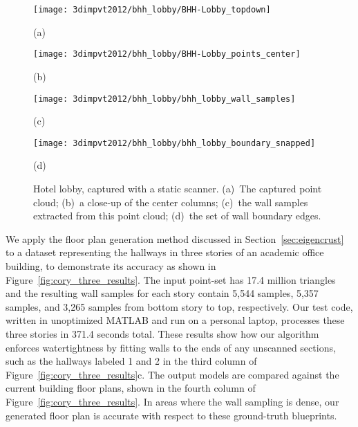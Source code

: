 \documentclass[12pt,onecolumn,oneside]{book}
\begin{document}
\begin{figure}[p]

\centering
\begin{minipage}[b]{0.49\linewidth}
  \centering
  \centerline{\texttt{[image: 3dimpvt2012/bhh\_lobby/BHH-Lobby\_topdown]}}
  \centerline{(a)}
\end{minipage}
\begin{minipage}[b]{0.49\linewidth}
  \centering
  \centerline{\texttt{[image: 3dimpvt2012/bhh\_lobby/BHH-Lobby\_points\_center]}}
  \centerline{(b)}
\end{minipage}

\begin{minipage}[b]{0.49\linewidth}
  \centering
  \centerline{\texttt{[image: 3dimpvt2012/bhh\_lobby/bhh\_lobby\_wall\_samples]}}
  \centerline{(c)}
\end{minipage}
\begin{minipage}[b]{0.49\linewidth}
  \centering
  \centerline{\texttt{[image: 3dimpvt2012/bhh\_lobby/bhh\_lobby\_boundary\_snapped]}}
  \centerline{(d)}
\end{minipage}

\caption[Hotel lobby, captured with a static scanner.]{Hotel lobby, captured with a static scanner. (a)~The captured point cloud; (b)~a close-up of the center columns; (c)~the wall samples extracted from this point cloud; (d)~the set of wall boundary edges.}
\label{fig:bhh_lobby_results}

\end{figure}

We apply the floor plan generation method discussed in Section~\ref{sec:eigencrust} to a dataset representing the hallways in three stories of an academic office building, to demonstrate its accuracy as shown in Figure~\ref{fig:cory_three_results}.  The input point-set has 17.4 million triangles and the resulting wall samples for each story contain 5,544 samples, 5,357 samples, and 3,265 samples from bottom story to top, respectively.  Our test code, written in unoptimized MATLAB and run on a personal laptop, processes these three stories in 371.4 seconds total.  These results show how our algorithm enforces watertightness by fitting walls to the ends of any unscanned sections, such as the hallways labeled 1 and 2 in the third column of Figure~\ref{fig:cory_three_results}c.  The output models are compared against the current building floor plans, shown in the fourth column of Figure~\ref{fig:cory_three_results}.  In areas where the wall sampling is dense, our generated floor plan is accurate with respect to these ground-truth blueprints.
\end{document}
